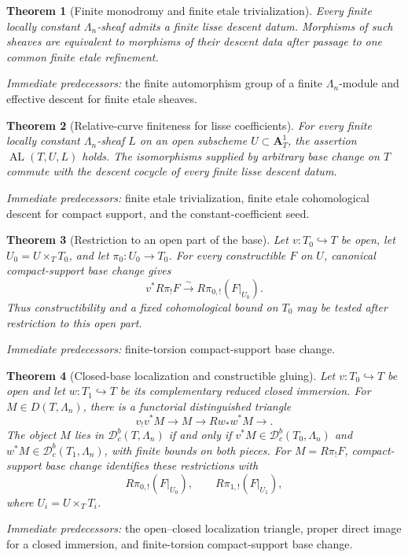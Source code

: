 \documentclass[10pt]{article}
\newtheorem{theorem}{Theorem}[section]
\theoremstyle{definition}
\newcommand{\Dbc}{\mathcal D^b_c}
\newcommand{\pred}[1]{\par\smallskip\begingroup\footnotesize\raggedright
\emph{Immediate predecessors:} #1.\par\endgroup}
\begin{document}
\begin{theorem}[Finite monodromy and finite etale trivialization]
Every finite locally constant \(\Lambda_n\)-sheaf admits a finite lisse
descent datum.  Morphisms of such sheaves are equivalent to morphisms of
their descent data after passage to one common finite etale refinement.
\end{theorem}
\pred{the finite automorphism group of a finite \(\Lambda_n\)-module and effective descent for finite etale sheaves}

\begin{theorem}[Relative-curve finiteness for lisse coefficients]
For every finite locally constant \(\Lambda_n\)-sheaf \(L\) on an open
subscheme \(U\subset\mathbf A^1_T\), the assertion
\(\operatorname{AL}(T,U,L)\) holds.  The isomorphisms supplied by arbitrary
base change on \(T\) commute with the descent cocycle of every finite lisse
descent datum.
\end{theorem}
\pred{finite etale trivialization, finite etale cohomological descent for compact support, and the constant-coefficient seed}

\begin{theorem}[Restriction to an open part of the base]
Let \(v:T_0\hookrightarrow T\) be open, let
\(U_0=U\times_TT_0\), and let \(\pi_0:U_0\to T_0\).  For every
constructible \(F\) on \(U\), canonical compact-support base change gives
\[
 v^*R\pi_!F\xrightarrow{\sim}
 R\pi_{0,!}(F|_{U_0}).
\]
Thus constructibility and a fixed cohomological bound on \(T_0\) may be
tested after restriction to this open part.
\end{theorem}
\pred{finite-torsion compact-support base change}

\begin{theorem}[Closed-base localization and constructible gluing]
Let \(v:T_0\hookrightarrow T\) be open and let
\(w:T_1\hookrightarrow T\) be its complementary reduced closed immersion.
For \(M\in D(T,\Lambda_n)\), there is a functorial distinguished triangle
\[
 v_!v^*M\longrightarrow M\longrightarrow
 Rw_*w^*M\longrightarrow.
\]
The object \(M\) lies in \(\Dbc(T,\Lambda_n)\) if and only if
\(v^*M\in\Dbc(T_0,\Lambda_n)\) and
\(w^*M\in\Dbc(T_1,\Lambda_n)\), with finite bounds on both pieces.
For \(M=R\pi_!F\), compact-support base change identifies these restrictions
with
\[
 R\pi_{0,!}(F|_{U_0}),\qquad
 R\pi_{1,!}(F|_{U_1}),
\]
where \(U_i=U\times_TT_i\).
\end{theorem}
\pred{the open--closed localization triangle, proper direct image for a closed immersion, and finite-torsion compact-support base change}
\end{document}
